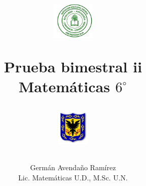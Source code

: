 \documentclass[10pt,letterpaper,addpoints]{exam}
\begin{document}
\title{\begin{minipage}{.2\textwidth}
        \includegraphics[height=1.75cm]{Images/logo-colegio.png}
       \end{minipage}
\begin{minipage}{.55\textwidth}
 \begin{center}
Prueba bimestral ii\\Matemáticas $6^{\circ}$
\end{center}
\end{minipage}
\begin{minipage}{.2\textwidth}
\includegraphics[height=1.75cm]{Images/logo-sed.png} 
\end{minipage}
}
\author{Germ\'{a}n Avendaño Ram\'{i}rez\\Lic. Matemáticas U.D., M.Sc. U.N.}
\date{}
\maketitle
\begin{center}
\end{center}
\vspace{0.1in}
\end{document}
